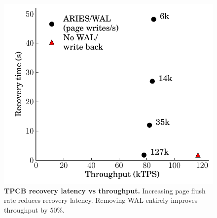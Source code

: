 \begin{figure}
  \includegraphics[width=\linewidth]{OLTP_design/TPCB_Recovery.pdf}
  \caption{\textbf{TPCB recovery latency vs throughput.} Increasing page flush rate reduces recovery latency.  Removing WAL entirely improves throughput by 50\%.}
  \label{fig::Recovery}
\end{figure}
